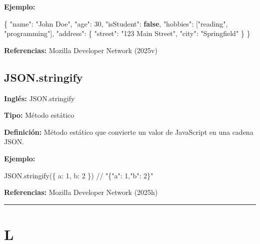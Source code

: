 \documentclass[
  letterpaper,
  DIV=11,
  numbers=noendperiod]{scrreprt}
\newenvironment{Shaded}{\begin{snugshade}}{\end{snugshade}}
\newcommand{\BuiltInTok}[1]{\textcolor[rgb]{0.00,0.23,0.31}{#1}}
\newcommand{\CommentTok}[1]{\textcolor[rgb]{0.37,0.37,0.37}{#1}}
\newcommand{\DataTypeTok}[1]{\textcolor[rgb]{0.68,0.00,0.00}{#1}}
\newcommand{\DecValTok}[1]{\textcolor[rgb]{0.68,0.00,0.00}{#1}}
\newcommand{\FunctionTok}[1]{\textcolor[rgb]{0.28,0.35,0.67}{#1}}
\newcommand{\KeywordTok}[1]{\textcolor[rgb]{0.00,0.23,0.31}{\textbf{#1}}}
\newcommand{\NormalTok}[1]{\textcolor[rgb]{0.00,0.23,0.31}{#1}}
\newcommand{\OperatorTok}[1]{\textcolor[rgb]{0.37,0.37,0.37}{#1}}
\newcommand{\StringTok}[1]{\textcolor[rgb]{0.13,0.47,0.30}{#1}}
\let\oldsubsection\subsection
\renewcommand{\subsection}{\phantomsection\oldsubsection}
\begin{document}
\textbf{Ejemplo:}

\begin{Shaded}
\begin{Highlighting}[]
\NormalTok{\{}
  \StringTok{"name"}\OperatorTok{:} \StringTok{"John Doe"}\OperatorTok{,}
  \StringTok{"age"}\OperatorTok{:} \DecValTok{30}\OperatorTok{,}
  \StringTok{"isStudent"}\OperatorTok{:} \KeywordTok{false}\OperatorTok{,}
  \StringTok{"hobbies"}\OperatorTok{:}\NormalTok{ [}\StringTok{"reading"}\OperatorTok{,} \StringTok{"programming"}\NormalTok{]}\OperatorTok{,}
  \StringTok{"address"}\OperatorTok{:}\NormalTok{ \{}
    \StringTok{"street"}\OperatorTok{:} \StringTok{"123 Main Street"}\OperatorTok{,}
    \StringTok{"city"}\OperatorTok{:} \StringTok{"Springfield"}
\NormalTok{  \}}
\NormalTok{\}}
\end{Highlighting}
\end{Shaded}

\textbf{Referencias:} Mozilla Developer Network (2025v)

\subsection*{JSON.stringify}\label{glos-json_stringify}

\textbf{Inglés:} JSON.stringify

\textbf{Tipo:} Método estático

\textbf{Definición:} Método estático que convierte un valor de
JavaScript en una cadena JSON.

\textbf{Ejemplo:}

\begin{Shaded}
\begin{Highlighting}[]
\BuiltInTok{JSON}\OperatorTok{.}\FunctionTok{stringify}\NormalTok{(\{ }\DataTypeTok{a}\OperatorTok{:} \DecValTok{1}\OperatorTok{,} \DataTypeTok{b}\OperatorTok{:} \DecValTok{2}\NormalTok{ \}) }\CommentTok{// "\{"a": 1,"b": 2\}"}
\end{Highlighting}
\end{Shaded}

\textbf{Referencias:} Mozilla Developer Network (2025h)

\begin{center}\rule{0.5\linewidth}{0.5pt}\end{center}

\section*{L}\label{l}
\end{document}
